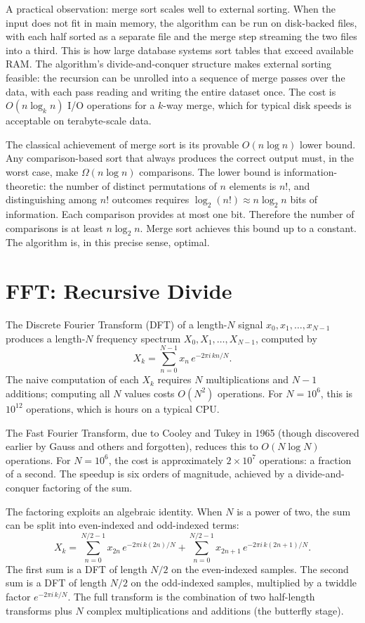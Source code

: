 A practical observation: merge sort scales well to external sorting.
When the input does not fit in main memory, the algorithm can be run
on disk-backed files, with each half sorted as a separate file and the
merge step streaming the two files into a third. This is how large
database systems sort tables that exceed available RAM. The
algorithm's divide-and-conquer structure makes external sorting
feasible: the recursion can be unrolled into a sequence of merge
passes over the data, with each pass reading and writing the entire
dataset once. The cost is $O(n \log_k n)$ I/O operations for a
$k$-way merge, which for typical disk speeds is acceptable on
terabyte-scale data.

The classical achievement of merge sort is its provable $O(n \log n)$
lower bound. Any comparison-based sort that always produces the
correct output must, in the worst case, make $\Omega(n \log n)$
comparisons. The lower bound is information-theoretic: the number of
distinct permutations of $n$ elements is $n!$, and distinguishing
among $n!$ outcomes requires $\log_2 (n!) \approx n \log_2 n$ bits of
information. Each comparison provides at most one bit. Therefore the
number of comparisons is at least $n \log_2 n$. Merge sort achieves
this bound up to a constant. The algorithm is, in this precise sense,
optimal.

\section{FFT: Recursive Divide}
\label{se:fft-recursive-divide}

The Discrete Fourier Transform (DFT) of a length-$N$ signal $x_0, x_1,
\ldots, x_{N-1}$ produces a length-$N$ frequency spectrum $X_0, X_1, \ldots,
X_{N-1}$, computed by
\[
X_k = \sum_{n=0}^{N-1} x_n \, e^{-2\pi i \, k n / N}.
\]
The naive computation of each $X_k$ requires $N$ multiplications and $N-1$
additions; computing all $N$ values costs $O(N^2)$ operations. For
$N = 10^6$, this is $10^{12}$ operations, which is hours on a typical CPU.

The Fast Fourier Transform, due to Cooley and Tukey in 1965 (though
discovered earlier by Gauss and others and forgotten), reduces this to
$O(N \log N)$ operations. For $N = 10^6$, the cost is approximately
$2 \times 10^7$ operations: a fraction of a second. The speedup is six
orders of magnitude, achieved by a divide-and-conquer factoring of the
sum.

The factoring exploits an algebraic identity. When $N$ is a power of two,
the sum can be split into even-indexed and odd-indexed terms:
\[
X_k = \sum_{n=0}^{N/2-1} x_{2n} \, e^{-2\pi i \, k (2n) / N}
     + \sum_{n=0}^{N/2-1} x_{2n+1} \, e^{-2\pi i \, k (2n+1) / N}.
\]
The first sum is a DFT of length $N/2$ on the even-indexed samples. The
second sum is a DFT of length $N/2$ on the odd-indexed samples, multiplied
by a twiddle factor $e^{-2\pi i \, k / N}$. The full transform is the
combination of two half-length transforms plus $N$ complex multiplications
and additions (the butterfly stage).

